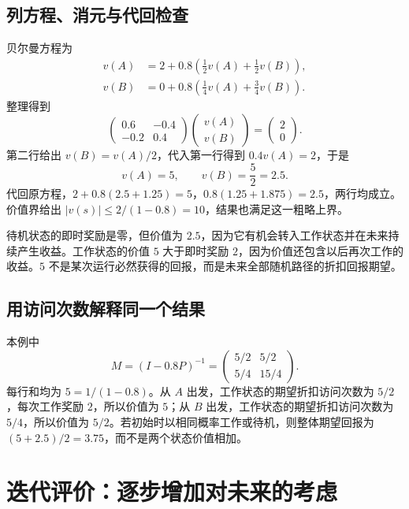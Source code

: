\documentclass[UTF8]{ctexart}
\begin{document}
\subsection{列方程、消元与代回检查}

贝尔曼方程为
\begin{equation}
  \begin{aligned}
    v(A)&=2+0.8\left(\frac12v(A)+\frac12v(B)\right),\\
    v(B)&=0+0.8\left(\frac14v(A)+\frac34v(B)\right).
  \end{aligned}
  \label{eq:mrp-example-bellman}
\end{equation}
整理得到
\[
  \begin{pmatrix}0.6&-0.4\\-0.2&0.4\end{pmatrix}
  \begin{pmatrix}v(A)\\v(B)\end{pmatrix}
  =\begin{pmatrix}2\\0\end{pmatrix}.
\]
第二行给出 $v(B)=v(A)/2$，代入第一行得到 $0.4v(A)=2$，于是
\begin{equation}
  v(A)=5,\qquad v(B)=\frac52=2.5.
  \label{eq:mrp-example-answer}
\end{equation}
代回原方程，$2+0.8(2.5+1.25)=5$，$0.8(1.25+1.875)=2.5$，两行均成立。价值界给出 $|v(s)|\leq2/(1-0.8)=10$，结果也满足这一粗略上界。

待机状态的即时奖励是零，但价值为 $2.5$，因为它有机会转入工作状态并在未来持续产生收益。工作状态的价值 $5$ 大于即时奖励 $2$，因为价值还包含以后再次工作的收益。$5$ 不是某次运行必然获得的回报，而是未来全部随机路径的折扣回报期望。

\subsection{用访问次数解释同一个结果}

本例中
\[
  M=(I-0.8P)^{-1}
   =\begin{pmatrix}5/2&5/2\\5/4&15/4\end{pmatrix}.
\]
每行和均为 $5=1/(1-0.8)$。从 $A$ 出发，工作状态的期望折扣访问次数为 $5/2$，每次工作奖励 $2$，所以价值为 $5$；从 $B$ 出发，工作状态的期望折扣访问次数为 $5/4$，所以价值为 $5/2$。若初始时以相同概率工作或待机，则整体期望回报为 $(5+2.5)/2=3.75$，而不是两个状态价值相加。

\section{迭代评价：逐步增加对未来的考虑}
\label{sec:mrp-iteration}
\end{document}
